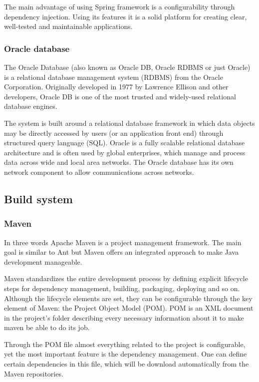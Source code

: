 %
The main advantage of using Spring framework is a configurability through
dependency injection. Using its features it is a solid platform for creating
clear, well-tested and maintainable applications.


\subsubsection{Oracle database~\cite{Oracle11g}}
The Oracle Database (also known as Oracle DB, Oracle RDBMS or just Oracle) is a
relational database management system (RDBMS) from the Oracle Corporation.
Originally developed in 1977 by Lawrence Ellison and other developers, Oracle DB
is one of the most trusted and widely-used relational database engines.

The system is built around a relational database framework in which data objects
may be directly accessed by users (or an application front end) through
structured query language (SQL). Oracle is a fully scalable relational database
architecture and is often used by global enterprises, which manage and process
data across wide and local area networks. The Oracle database has its own
network component to allow communications across networks.


\subsection{Build system}

\subsubsection{Maven~\cite{ApacheMaven}}
In three words Apache Maven is a project management framework. The main goal is 
similar to Ant but Maven offers an integrated approach to make Java development
manageable. 

Maven standardizes the entire development process by defining explicit lifecycle
steps for dependency management, building, packaging, deploying and so on.
Although the lifecycle elements are set, they can be configurable through the 
key element of Maven: the Project Object Model (POM). POM is an XML document in 
the project's folder describing every necessary information about it to make 
maven be able to do its job. 

Through the POM file almost everything related to the project is configurable,
yet the most important feature is the dependency management. One can define
certain dependencies in this file, which will be download automatically from 
the Maven repositories.

